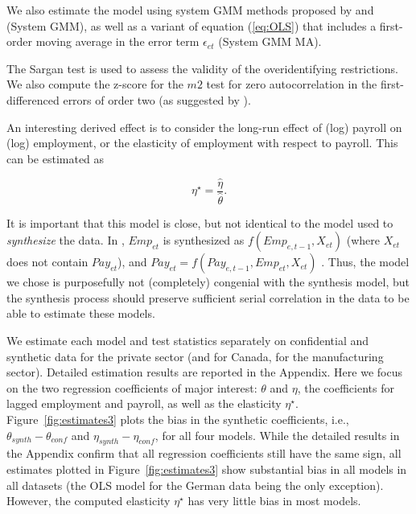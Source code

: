 We also estimate the model using system GMM methods proposed by \textcite{RePEc:eee:econom:v:68:y:1995:i:1:p:29-51} and \textcite{RePEc:eee:econom:v:87:y:1998:i:1:p:115-143} (System GMM), as well as a variant of equation (\ref{eq:OLS}) that includes a first-order moving average in the error term $\epsilon_{et}$ (System GMM MA).

The Sargan test is used to assess the validity of the overidentifying restrictions. We also compute the z-score for the $m2$ test for zero autocorrelation in the  first-differenced errors of order two (as suggested by \textcite{RePEc:oup:restud:v:58:y:1991:i:2:p:277-297.}). 

An interesting derived effect is to consider the long-run effect of (log) payroll on (log) employment, or the elasticity of employment with respect to payroll. This can be estimated as

$$
\eta^\star = \frac{\hat{\eta}}{\hat{\theta}}.
$$

It is important that this model is close, but not identical to the model used to \textit{synthesize} the data. In \SynLBD, $Emp_{et}$ is synthesized as $f(Emp_{e,t-1},X_{et})$ (where $X_{et}$ does not contain $Pay_{et}$), and $Pay_{et} = f(Pay_{e,t-1},Emp_{et},X_{et})$ \citep[pg. 366]{KinneyEtAl2011}. Thus, the model we chose is purposefully not (completely) congenial with the synthesis model, but the synthesis process \SynLBD{} should preserve sufficient serial correlation in the data to be able to estimate these models.

We estimate each model and test statistics separately on confidential and synthetic data for the private sector (and for Canada, for the manufacturing sector). Detailed estimation results are reported in the Appendix. Here we  focus on the two regression coefficients of major interest: $\theta$ and $\eta$, the coefficients for lagged employment and payroll, as well as the elasticity $\eta^\star$. Figure~\ref{fig:estimates3} plots the bias in the synthetic coefficients, i.e., $\theta_{synth}-\theta_{conf}$ and $\eta_{synth}-\eta_{conf}$, for all four models. While the detailed results in the Appendix confirm that all regression coefficients still have the same sign, all estimates plotted in Figure~\ref{fig:estimates3} show substantial bias in all models in all datasets (the OLS model for the German data being the only exception). However, the computed elasticity $\eta^\star$ has very little bias in most models.




